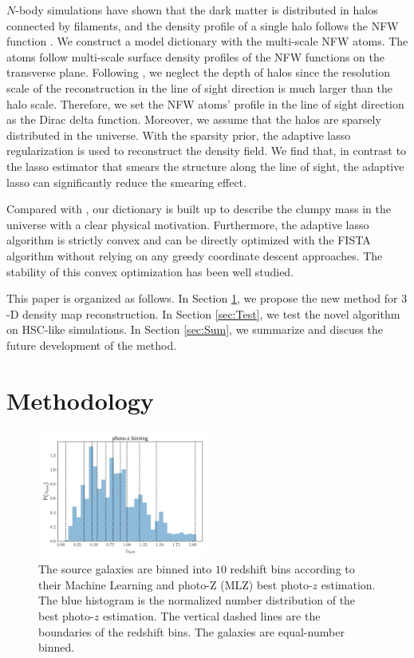 \documentclass[twocolumn]{aastex62}
\begin{document}
$N$-body simulations have shown that the dark matter is distributed in halos
connected by filaments, and the density profile of a single halo follows the
NFW function \citep{halo-NFW1997ApJ}.  We construct a model dictionary with the
multi-scale NFW atoms.  The atoms follow multi-scale surface density profiles
of the NFW functions \citep{haloModel-TJ2003-3pt} on the transverse plane.
Following \citet{LSS-massMap-Glimpse3D-Leonard2014}, we neglect the depth of
halos since the resolution scale of the reconstruction in the line of sight
direction is much larger than the halo scale. Therefore, we set the NFW atoms'
profile in the line of sight direction as the Dirac delta function.  Moreover,
we assume that the halos are sparsely distributed in the universe.  With the
sparsity prior, the adaptive lasso regularization \citep{AdaLASSO-Zou2006} is
used to reconstruct the density field.  We find that, in contrast to the lasso
estimator that smears the structure along the line of sight, the adaptive lasso
can significantly reduce the smearing effect.

Compared with \citet{LSS-massMap-Glimpse3D-Leonard2014}, our dictionary is
built up to describe the clumpy mass in the universe with a clear physical
motivation. Furthermore, the adaptive lasso algorithm is strictly convex and
can be directly optimized with the FISTA algorithm \citep{FISTA-Beck2009}
without relying on any greedy coordinate descent approaches. The stability of
this convex optimization has been well studied.

This paper is organized as follows.
In Section \ref{sec:Method}, we propose the new method for $3$-D density map
reconstruction.
In Section \ref{sec:Test}, we test the novel algorithm on HSC-like simulations.
In Section \ref{sec:Sum}, we summarize and discuss the future development of
the method.

\section{Methodology}
\label{sec:Method}

\begin{figure}[!t]
 \centering
 \includegraphics[width=0.5\textwidth]{photo-z_binning.pdf}
 \caption{The source galaxies are binned into $10$ redshift bins according to
         their Machine Learning and photo-Z (MLZ) best photo-$z$ estimation. The
         blue histogram is the normalized number distribution of the best photo-$z$
         estimation. The vertical dashed lines are the boundaries of the redshift bins.
         The galaxies are equal-number binned.
        } \label{fig-bestpz}
\end{figure}
\end{document}
